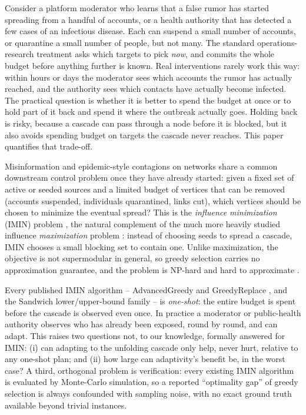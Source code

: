 \documentclass[ASNA,number]{USG}
\begin{document}
Consider a platform moderator who learns that a false rumor has started
spreading from a handful of accounts, or a health authority that has detected
a few cases of an infectious disease. Each can suspend a small number of
accounts, or quarantine a small number of people, but not many. The standard
operations-research treatment asks which targets to pick \emph{now}, and
commits the whole budget before anything further is known. Real interventions
rarely work this way: within hours or days the moderator sees which accounts
the rumor has actually reached, and the authority sees which contacts have
actually become infected. The practical question is whether it is better to
spend the budget at once or to hold part of it back and spend it where the
outbreak actually goes. Holding back is risky, because a cascade can pass
through a node before it is blocked, but it also avoids spending budget on
targets the cascade never reaches. This paper quantifies that trade-off.

Misinformation and epidemic-style contagions on networks share a common
downstream control problem once they have already started: given a fixed
set of active or seeded sources and a limited budget of vertices that can be
removed (accounts suspended, individuals quarantined, links cut), which
vertices should be chosen to minimize the eventual spread? This is the
\emph{influence minimization} (IMIN) problem \citep{xie2023,xie2024}, the
natural complement of the much more heavily studied influence
\emph{maximization} problem \citep{kempe2003}: instead of choosing seeds to
spread a cascade, IMIN chooses a small blocking set to contain one. Unlike
maximization, the objective is not supermodular in general, so greedy
selection carries no approximation guarantee, and the problem is NP-hard and
hard to approximate \citep{xie2023}.

Every published IMIN algorithm -- AdvancedGreedy and GreedyReplace
\citep{xie2023,xie2024}, and the Sandwich lower/upper-bound family
\citep{wang2024sandwich} -- is \emph{one-shot}: the entire budget is spent
before the cascade is observed even once. In practice a moderator or
public-health authority observes who has already been exposed, round by
round, and can adapt. This raises two questions not, to our knowledge,
formally answered for IMIN: (i) can adapting to the unfolding cascade only
help, never hurt, relative to any one-shot plan; and (ii) how large can
adaptivity's benefit be, in the worst case? A third, orthogonal problem is
verification: every existing IMIN algorithm is evaluated by Monte-Carlo
simulation, so a reported ``optimality gap'' of greedy selection is
always confounded with sampling noise, with no exact ground truth
available beyond trivial instances.
\end{document}
